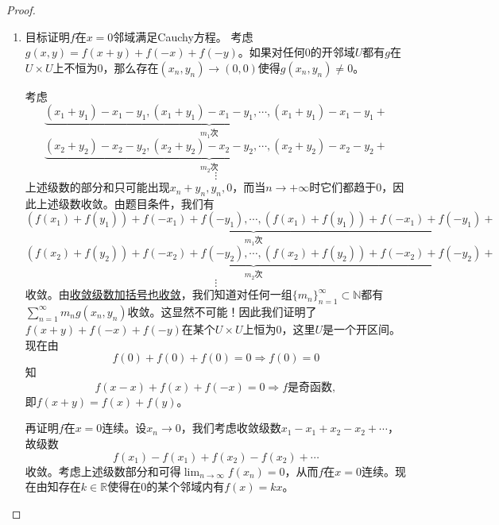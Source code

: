 \documentclass[../../main.tex]{subfiles}%
\begin{document}
\begin{proof}
\begin{enumerate}
\item 目标证明$f$在$x=0$邻域满足Cauchy方程。
考虑$g(x,y)=f(x+y)+f(-x)+f(-y)$。如果对任何$0$的开邻域$U$都有$g$在$U\times U$上不恒为$0$，那么存在$(x_n,y_n)\to(0,0)$使得$g(x_n,y_n)\neq0$。

考虑
\[
\underbrace{(x_1+y_1)-x_1-y_1,(x_1+y_1)-x_1-y_1,\cdots,(x_1+y_1)-x_1-y_1}_{m_1次}+
\]
\[
\underbrace{(x_2+y_2)-x_2-y_2,(x_2+y_2)-x_2-y_2,\cdots,(x_2+y_2)-x_2-y_2}_{m_2次}+
\]
\[
\vdots
\]
上述级数的部分和只可能出现$x_n+y_n,y_n,0$，而当$n\to+\infty$时它们都趋于$0$，因此上述级数收敛。由题目条件，我们有
\[
\underbrace{(f(x_1)+f(y_1))+f(-x_1)+f(-y_1),\cdots,(f(x_1)+f(y_1))+f(-x_1)+f(-y_1)}_{m_1次}+
\]
\[
\underbrace{(f(x_2)+f(y_2))+f(-x_2)+f(-y_2),\cdots,(f(x_2)+f(y_2))+f(-x_2)+f(-y_2)}_{m_2次}+
\]
\[
\vdots
\]
收敛。由\hyperref[theorem:级数加括号的理解]{收敛级数加括号也收敛}，我们知道对任何一组$\{m_n\}_{n=1}^{\infty}\subset\mathbb{N}$都有$\sum_{n=1}^{\infty}m_ng(x_n,y_n)$收敛。这显然不可能！因此我们证明了$f(x+y)+f(-x)+f(-y)$在某个$U\times U$上恒为$0$，这里$U$是一个开区间。现在由
\[
f(0)+f(0)+f(0)=0\Rightarrow f(0)=0
\]
知
\[
f(x-x)+f(x)+f(-x)=0\Rightarrow f\text{是奇函数},
\]
即$f(x+y)=f(x)+f(y)$。

再证明$f$在$x=0$连续。设$x_n\to0$，我们考虑收敛级数$x_1-x_1+x_2-x_2+\cdots$，故级数
\[
f(x_1)-f(x_1)+f(x_2)-f(x_2)+\cdots
\]
收敛。考虑上述级数部分和可得$\lim_{n\to\infty}f(x_n)=0$，从而$f$在$x=0$连续。现在由知存在$k\in\mathbb{R}$使得在$0$的某个邻域内有$f(x)=kx$。
\end{enumerate}

\end{proof}
\end{document}
